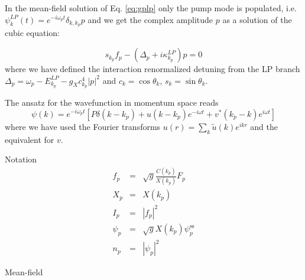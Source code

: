 \documentclass[a4paper,prb,10pt,aps,twocolumn]{revtex4-1}
\begin{document}
In the mean-field solution of Eq. \ref{eq:gplp} only the pump mode
is populated, i.e. $\psi_{k}^{LP}(t)=e^{-i\omega_{p}t}\delta_{k,k_{p}}p$ and we get the complex amplitude $p$ as a solution of the cubic equation:

\begin{equation}
s_{k_{p}}f_{p}-\left(\Delta_{p}+i\kappa_{k_{p}}^{LP}\right)p=0
\end{equation}
where we have defined the interaction renormalized detuning from the
LP branch $\Delta_{p}=\omega_{p}-E_{k_{p}}^{LP}-g_{X}c_{k_{p}}^{4}|p|^{2}$ 
and $c_{k}=\cos\theta_{k}$,  $s_{k}=\sin\theta_{k}$.

The ansatz for the wavefunction in momentum space reads
\begin{equation}
\psi(k) = e^{-i\omega_p t} \left[P\delta(k-k_p) + 
u(k-k_p) e^{-i \omega t} + v^*(k_p-k) e^{i \omega 
t}\right]
\end{equation}
where we have used the Fourier transforms $u(r)=\sum_k \widetilde{u}(k) e^{ikr}$ and the equivalent for
$v$.

Notation
\begin{subequations}
  \begin{eqnarray}
    \label{eq:114}
    f_p& =& \sqrt{g} \frac{C(k_p)}{X(k_p)} F_p\\
X_p& =& X(k_p)\\
I_p& =& \left| f_p \right|^2\\
\psi_p&=& \sqrt{g} X(k_p) \psi^{\text{ss}}_p\\
n_p& =& \left|\psi_p \right|^2
  \end{eqnarray}
\end{subequations}


Mean-field
\end{document}
